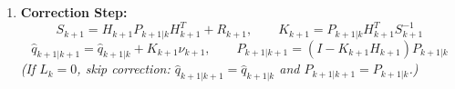 \documentclass[10pt, a4paper]{article}
\begin{document}
\begin{enumerate}
\begin{itemize}
        \item Stack the $2 \times 3$ matrices $H_{k+1,i}$ vertically to form $H_{k+1} \in \mathbb{R}^{2L_k \times 3}$, and build block-diagonal $R_{k+1} = \text{diag}(R_{k+1,1}, \dots, R_{k+1,L_k})$.
    \end{itemize}
    \item \textbf{Correction Step:}
    \[
        S_{k+1} = H_{k+1} P_{k+1|k} H_{k+1}^T + R_{k+1}, \qquad K_{k+1} = P_{k+1|k} H_{k+1}^T S_{k+1}^{-1}
    \]
    \[
        \hat{q}_{k+1|k+1} = \hat{q}_{k+1|k} + K_{k+1}\nu_{k+1}, \qquad P_{k+1|k+1} = (I - K_{k+1}H_{k+1})P_{k+1|k}
    \]
    \textit{(If $L_k = 0$, skip correction: $\hat{q}_{k+1|k+1} = \hat{q}_{k+1|k}$ and $P_{k+1|k+1} = P_{k+1|k}$.)}
\end{enumerate}
\end{document}
